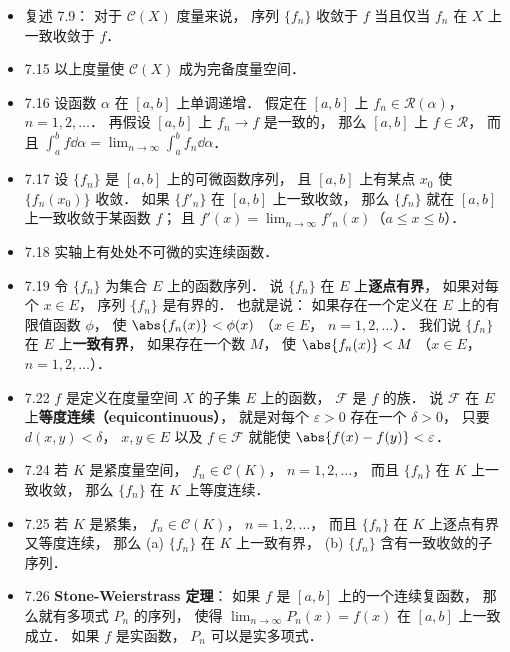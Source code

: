 \begin{itemize}
\item 复述 7.9： 对于 $\mathscr C(X)$ 度量来说， 序列 $\{f_n\}$ 收敛于 $f$ 当且仅当 $f_n$ 在 $X$ 上一致收敛于 $f$．

\item 7.15 以上度量使 $\mathscr C(X)$ 成为完备度量空间．

\item 7.16 设函数 $\alpha$ 在 $[a,b]$ 上单调递增． 假定在 $[a,b]$ 上 $f_n\in\mathscr R(\alpha)$， $n=1,2,\dots$． 再假设 $[a,b]$ 上 $f_n\to f$ 是一致的， 那么 $[a,b]$ 上 $f\in\mathscr R$， 而且 $\int_a^b f\dd{\alpha} = \lim_{n\to\infty}\int_a^b f_n\dd{\alpha}$．

\item 7.17 设 $\{f_n\}$ 是 $[a,b]$ 上的可微函数序列， 且 $[a,b]$ 上有某点 $x_0$ 使 $\{f_n(x_0)\}$ 收敛． 如果 $\{f'_n\}$ 在 $[a,b]$ 上一致收敛， 那么 $\{f_n\}$ 就在 $[a,b]$ 上一致收敛于某函数 $f$； 且 $f'(x) = \lim_{n\to\infty} f'_n(x)$（$a\leqslant x \leqslant b$）．

\item 7.18 实轴上有处处不可微的实连续函数．

\item 7.19 令 $\{f_n\}$ 为集合 $E$ 上的函数序列． 说 $\{f_n\}$ 在 $E$ 上\textbf{逐点有界}， 如果对每个 $x\in E$， 序列 $\{f_n\}$ 是有界的． 也就是说： 如果存在一个定义在 $E$ 上的有限值函数 $\phi$， 使 $\abs{f_n(x)}<\phi(x)$ （$x\in E$， $n=1,2,\dots$）． 我们说 $\{f_n\}$ 在 $E$ 上\textbf{一致有界}， 如果存在一个数 $M$， 使 $\abs{f_n(x)}<M$ （$x\in E$， $n=1,2,\dots$）．

\item 7.22 $f$ 是定义在度量空间 $X$ 的子集 $E$ 上的函数， $\mathscr F$ 是 $f$ 的族． 说 $\mathscr F$ 在 $E$ 上\textbf{等度连续（equicontinuous）}， 就是对每个 $\varepsilon>0$ 存在一个 $\delta >0$， 只要 $d(x,y)<\delta$， $x,y\in E$ 以及 $f\in \mathscr F$ 就能使 $\abs{f(x)-f(y)}<\varepsilon$．

\item 7.24 若 $K$ 是紧度量空间， $f_n\in \mathscr C(K)$， $n=1,2,\dots$， 而且 $\{f_n\}$ 在 $K$ 上一致收敛， 那么 $\{f_n\}$ 在 $K$ 上等度连续．

\item 7.25 若 $K$ 是紧集， $f_n\in \mathscr C(K)$， $n=1,2,\dots$， 而且 $\{f_n\}$ 在 $K$ 上逐点有界又等度连续， 那么 (a) $\{f_n\}$ 在 $K$ 上一致有界， (b) $\{f_n\}$ 含有一致收敛的子序列．

\item 7.26 \textbf{Stone-Weierstrass 定理}： 如果 $f$ 是 $[a,b]$ 上的一个连续复函数， 那么就有多项式 $P_n$ 的序列， 使得 $\lim_{n\to\infty} P_n(x) = f(x)$ 在 $[a,b]$ 上一致成立． 如果 $f$ 是实函数， $P_n$ 可以是实多项式．

\end{itemize}


